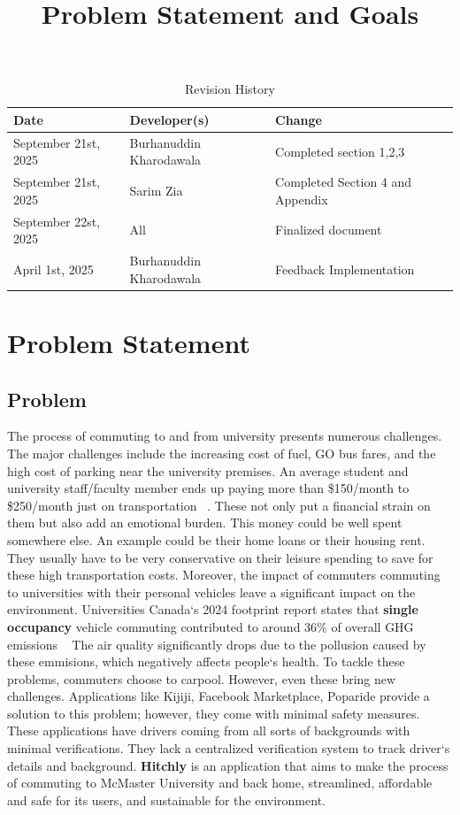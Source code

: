 \documentclass{article}
\title{Problem Statement and Goals\\\progname}
\author{\authname}
\date{}
\begin{document}
\maketitle

\begin{table}[hp]
\caption{Revision History} \label{TblRevisionHistory}
\begin{tabularx}{\textwidth}{llX}
\toprule
\textbf{Date} & \textbf{Developer(s)} & \textbf{Change}\\
\midrule
September 21st, 2025 & Burhanuddin Kharodawala & Completed section 1,2,3\\
September 21st, 2025 & Sarim Zia & Completed Section 4 and Appendix\\
September 22st, 2025 & All & Finalized document\\
April 1st, 2025 & Burhanuddin Kharodawala & Feedback Implementation\\

\bottomrule
\end{tabularx}
\end{table}

\section{Problem Statement}

\subsection{Problem}

The process of commuting to and from university presents numerous 
challenges. The major challenges include the 
increasing cost of fuel, GO bus fares, and the high 
cost of parking near the university premises. 
An average student and university staff/faculty 
member ends up paying more than 
\$150/month to \$250/month just on transportation ~\citep{ChandaAndSo2025}.
These not only put a financial strain on them but also 
add an emotional burden. This money could be well spent somewhere else. 
An example could be their home loans or their housing rent. 
They usually have to be very conservative on their leisure spending to save for these high transportation costs.
Moreover, the impact 
of commuters commuting to universities with their 
personal vehicles leave a significant impact on 
the environment. Universities Canada`s 2024 
footprint report states that \textbf{single occupancy} vehicle commuting contributed to around 
36\% of overall GHG emissions ~\citep{Kebirungi2024}
The air quality significantly drops due to the pollusion caused by these emmisions, which negatively affects people`s health.
To tackle these problems, commuters choose 
to carpool. However, even these bring new 
challenges. Applications like Kijiji, 
Facebook Marketplace, Poparide provide a 
solution to this problem; however, they come 
with minimal safety measures. These applications 
have drivers coming from all sorts of backgrounds 
with minimal verifications. They lack a centralized 
verification system to track driver`s details and background. 
\textbf{Hitchly} is an application that aims to make the process of commuting to McMaster 
University and back home, streamlined, affordable and safe for its users, and 
sustainable for the environment. 
\end{document}
